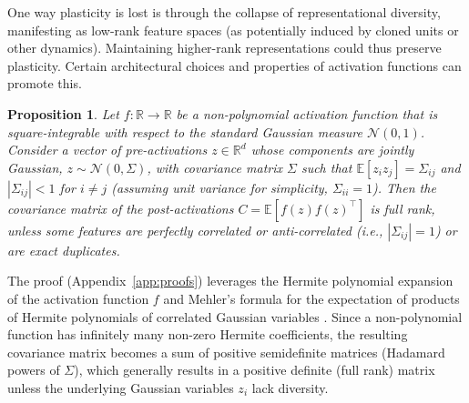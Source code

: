 \documentclass{article}
\newcommand{\R}{\mathbb{R}}
\newcommand{\E}{\mathbb{E}}
\newtheorem{proposition}{Proposition}[section]
\begin{document}
One way plasticity is lost is through the collapse of representational diversity, manifesting as low-rank feature spaces (as potentially induced by cloned units or other dynamics). Maintaining higher-rank representations could thus preserve plasticity. Certain architectural choices and properties of activation functions can promote this.

\begin{proposition}
\label{prop:rank}
Let $f:\R\to\R$ be a non-polynomial activation function that is square-integrable with respect to the standard Gaussian measure $\mathcal{N}(0,1)$. Consider a vector of pre-activations $z\in\R^d$ whose components are jointly Gaussian, $z \sim \mathcal{N}(0, \Sigma)$, with covariance matrix $\Sigma$ such that $\E[z_i z_j]=\Sigma_{ij}$ and $|\Sigma_{ij}|<1$ for $i \neq j$ (assuming unit variance for simplicity, $\Sigma_{ii}=1$). Then the covariance matrix of the post-activations $C = \E[f(z)f(z)^\top]$ is full rank, unless some features are perfectly correlated or anti-correlated (i.e., $|\Sigma_{ij}|=1$) or are exact duplicates.
\end{proposition}

The proof (Appendix~\ref{app:proofs}) leverages the Hermite polynomial expansion of the activation function $f$ \cite{erdelyi1953higher} and Mehler's formula for the expectation of products of Hermite polynomials of correlated Gaussian variables \cite{mehler1866ueber, erdelyi1953higher}. Since a non-polynomial function has infinitely many non-zero Hermite coefficients, the resulting covariance matrix becomes a sum of positive semidefinite matrices (Hadamard powers of $\Sigma$), which generally results in a positive definite (full rank) matrix unless the underlying Gaussian variables $z_i$ lack diversity.
\end{document}
